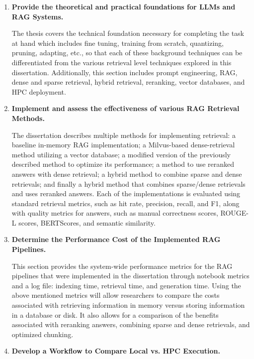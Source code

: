 \begin{enumerate}

    \item \textbf{Provide the theoretical and practical foundations for \acp{LLM} and \ac{RAG} Systems.}
    
    The thesis covers the technical foundation necessary for completing the task at hand which includes fine tuning, training from scratch, quantizing, pruning, adapting, etc., so that each of these background techniques can be differentiated from the various retrieval level techniques explored in this dissertation. Additionally, this section includes prompt engineering, \ac{RAG}, dense and sparse retrieval, hybrid retrieval, reranking, vector databases, and \ac{HPC} deployment.
    
    \item \textbf{Implement and assess the effectiveness of various \ac{RAG} Retrieval Methods.}
    
    The dissertation describes multiple methods for implementing retrieval: a baseline in-memory \ac{RAG} implementation; a Milvus-based dense-retrieval method utilizing a vector database; a modified version of the previously described method to optimize its performance; a method to use reranked answers with dense retrieval; a hybrid method to combine sparse and dense retrievals; and finally a hybrid method that combines sparse/dense retrievals and uses reranked answers. Each of the implementations is evaluated using standard retrieval metrics, such as hit rate, precision, recall, and F1, along with quality metrics for answers, such as manual correctness scores, ROUGE-L scores, BERTScores, and semantic similarity.
    
    \item \textbf{Determine the Performance Cost of the Implemented \ac{RAG} Pipelines.}
    
    This section provides the system-wide performance metrics for the \ac{RAG} pipelines that were implemented in the dissertation through notebook metrics and a log file: indexing time, retrieval time, and generation time. Using the above mentioned metrics will allow researchers to compare the costs associated with retrieving information in memory versus storing information in a database or disk. It also allows for a comparison of the benefits associated with reranking answers, combining sparse and dense retrievals, and optimized chunking.
    
    \item \textbf{Develop a Workflow to Compare Local vs. \ac{HPC} Execution.}
    

\end{enumerate}
